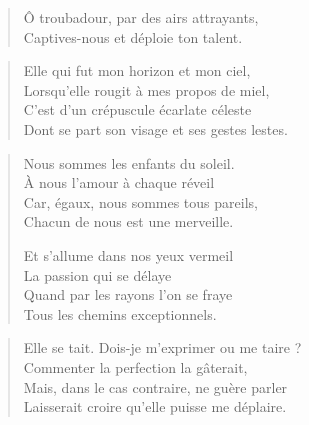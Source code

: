 \begin{verse}%
  \distique%
  Ô troubadour, par des airs attrayants,\\  %
  Captives-nous et déploie ton talent.
\end{verse}

\begin{verse}%
  \quatrain%
  Elle qui fut mon horizon et mon ciel,\\  %
  Lorsqu’elle rougit à mes propos de miel,\\  %
  C’est d’un crépuscule écarlate céleste\\  %
  Dont se part son visage et ses gestes lestes.
\end{verse}

\begin{verse}%
  \quatrain%
  Nous sommes les enfants du soleil.\\  %
  À nous l’amour à chaque réveil\\  %
  Car, égaux, nous sommes tous pareils,\\  %
  Chacun de nous est une merveille.

  Et s’allume dans nos yeux vermeil\\  %
  La passion qui se délaye\\  %
  Quand par les rayons l’on se fraye\\  %
  Tous les chemins exceptionnels.
\end{verse}

\begin{verse}%
  \quatrain%
  Elle se tait. Dois-je m’exprimer ou me taire ?\\  %
  Commenter la perfection la gâterait,\\  %
  Mais, dans le cas contraire, ne guère parler\\  %
  Laisserait croire qu’elle puisse me déplaire.
\end{verse}

